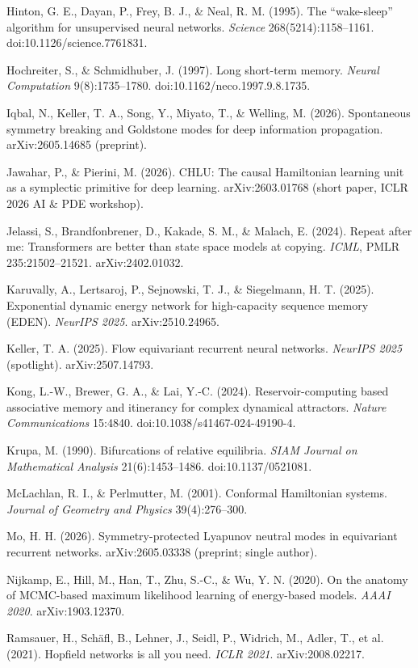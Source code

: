 \documentclass{article}
\begin{document}
{Hinton, G. E., Dayan, P., Frey, B. J., \& Neal, R. M. (1995). The ``wake-sleep'' algorithm for unsupervised neural networks. \emph{Science} 268(5214):1158--1161. doi:10.1126/science.7761831.\par
Hochreiter, S., \& Schmidhuber, J. (1997). Long short-term memory. \emph{Neural Computation} 9(8):1735--1780. doi:10.1162/neco.1997.9.8.1735.\par
Iqbal, N., Keller, T. A., Song, Y., Miyato, T., \& Welling, M. (2026). Spontaneous symmetry breaking and Goldstone modes for deep information propagation. arXiv:2605.14685 (preprint).\par
Jawahar, P., \& Pierini, M. (2026). CHLU: The causal Hamiltonian learning unit as a symplectic primitive for deep learning. arXiv:2603.01768 (short paper, ICLR 2026 AI \& PDE workshop).\par
Jelassi, S., Brandfonbrener, D., Kakade, S. M., \& Malach, E. (2024). Repeat after me: Transformers are better than state space models at copying. \emph{ICML}, PMLR 235:21502--21521. arXiv:2402.01032.\par
Karuvally, A., Lertsaroj, P., Sejnowski, T. J., \& Siegelmann, H. T. (2025). Exponential dynamic energy network for high-capacity sequence memory (EDEN). \emph{NeurIPS 2025}. arXiv:2510.24965.\par
Keller, T. A. (2025). Flow equivariant recurrent neural networks. \emph{NeurIPS 2025} (spotlight). arXiv:2507.14793.\par
Kong, L.-W., Brewer, G. A., \& Lai, Y.-C. (2024). Reservoir-computing based associative memory and itinerancy for complex dynamical attractors. \emph{Nature Communications} 15:4840. doi:10.1038/s41467-024-49190-4.\par
Krupa, M. (1990). Bifurcations of relative equilibria. \emph{SIAM Journal on Mathematical Analysis} 21(6):1453--1486. doi:10.1137/0521081.\par
McLachlan, R. I., \& Perlmutter, M. (2001). Conformal Hamiltonian systems. \emph{Journal of Geometry and Physics} 39(4):276--300.\par
Mo, H. H. (2026). Symmetry-protected Lyapunov neutral modes in equivariant recurrent networks. arXiv:2605.03338 (preprint; single author).\par
Nijkamp, E., Hill, M., Han, T., Zhu, S.-C., \& Wu, Y. N. (2020). On the anatomy of MCMC-based maximum likelihood learning of energy-based models. \emph{AAAI 2020}. arXiv:1903.12370.\par
Ramsauer, H., Sch\"afl, B., Lehner, J., Seidl, P., Widrich, M., Adler, T., et al. (2021). Hopfield networks is all you need. \emph{ICLR 2021}. arXiv:2008.02217.\par
}
\end{document}
